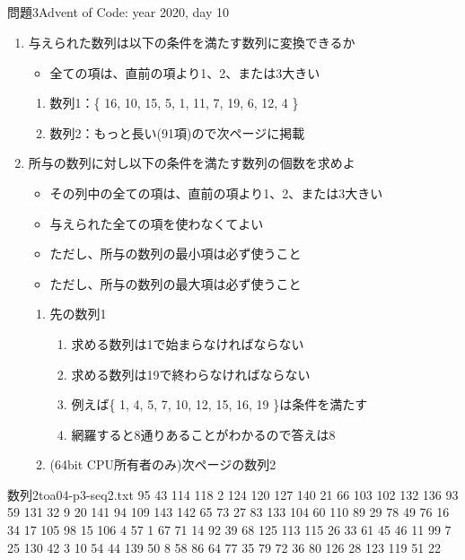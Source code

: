 \documentclass{beamer}
\begin{document}
\subsection{}

\begin{frame}[fragile]{問題3}{Advent of Code: year 2020, day 10}
\begin{enumerate}\itemsep8pt
\item 与えられた数列は以下の条件を満たす数列に変換できるか
\begin{itemize}%
\item 全ての項は、直前の項より1、2、または3大きい
\end{itemize}
\begin{enumerate}%
\item 数列1：\{ 16, 10, 15, 5, 1, 11, 7, 19, 6, 12, 4 \}
\item 数列2：もっと長い(91項)ので次ページに掲載
\end{enumerate}
\item 所与の数列に対し以下の条件を満たす数列の個数を求めよ
\begin{itemize}%
\item その列中の全ての項は、直前の項より1、2、または3大きい
\item 与えられた全ての項を使わなくてよい
\item ただし、所与の数列の最小項は必ず使うこと
\item ただし、所与の数列の最大項は必ず使うこと
\end{itemize}
\begin{enumerate}%
\item 先の数列1
\begin{enumerate}%
\item 求める数列は1で始まらなければならない
\item 求める数列は19で終わらなければならない
\item 例えば\{ 1, 4, 5, 7, 10, 12, 15, 16, 19 \}は条件を満たす
\item 網羅すると8通りあることがわかるので答えは8
\end{enumerate}
\item (64bit CPU所有者のみ)次ページの数列2
\end{enumerate}
\end{enumerate}
\end{frame}

\begin{frame}[fragile]{数列2}{toa04-p3-seq2.txt}
95
43
114
118
2
124
120
127
140
21
66
103
102
132
136
93
59
131
32
9
20
141
94
109
143
142
65
73
27
83
133
104
60
110
89
29
78
49
76
16
34
17
105
98
15
106
4
57
1
67
71
14
92
39
68
125
113
115
26
33
61
45
46
11
99
7
25
130
42
3
10
54
44
139
50
8
58
86
64
77
35
79
72
36
80
126
28
123
119
51
22
\end{frame}
\end{document}
